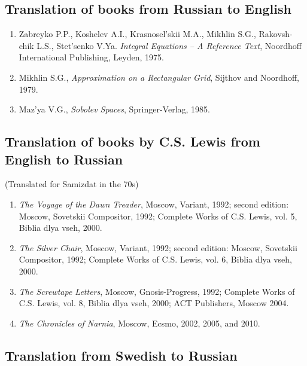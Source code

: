 \documentclass{article}
\begin{document}
\subsection*{Translation of books from Russian to English}


\begin{enumerate}
\item Zabreyko P.P., Koshelev A.I., Krasnosel'skii M.A., Mikhlin
S.G., Rakovsh- chik L.S., Stet'senko V.Ya. {\it Integral
Equations -- A Reference Text}, Noordhoff International Publishing,
Leyden, 1975.

\item Mikhlin S.G., {\it Approximation on a Rectangular Grid},
Sijthov and Noordhoff, 1979.

\item Maz'ya V.G., {\it Sobolev Spaces}, Springer-Verlag, 1985.

\end{enumerate}

\subsection*{Translation of books by C.S. Lewis from English to
Russian}

\centerline{(Translated for Samizdat in the 70s)}

\begin{enumerate}
\item {\it The Voyage of the Dawn Treader}, Moscow, Variant, 1992;
second edition: Moscow, Sovetskii Compositor, 1992;
Complete Works of C.S. Lewis, vol. 5, Biblia dlya vseh, 2000.

\item {\it The Silver Chair}, Moscow, Variant, 1992; second edition:
Moscow, Sovetskii Compositor, 1992;
Complete Works of C.S. Lewis, vol. 6, Biblia dlya vseh, 2000.

\item {\it The Screwtape Letters}, Moscow, Gnosis-Progress, 1992;
Complete Works of C.S. Lewis, vol. 8, Biblia dlya vseh, 2000; ACT Publishers, Moscow 2004.

\item {\it The Chronicles of Narnia}, Moscow, Ecsmo, 2002,  2005, and 2010. 
\end{enumerate}

\subsection*{Translation  from Swedish to Russian}
\end{document}
